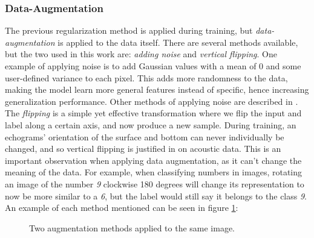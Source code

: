 \subsubsection{Data-Augmentation}
    The previous regularization method is applied during training, but \textit{data-augmentation} is applied to the data itself\cite{kukavcka2017_regularization}. There are several methods available, but the two used in this work are: \textit{adding noise} and \textit{vertical flipping}. One example of applying noise is to add Gaussian values with a mean of 0 and some user-defined variance to each pixel. This adds more randomness to the data, making the model learn more general features instead of specific, hence increasing generalization performance. Other methods of applying noise are described in \citeauthor{kukavcka2017_regularization}\cite{kukavcka2017_regularization}. The \textit{flipping} is a simple yet effective transformation where we flip the input and label along a certain axis, and now produce a new sample. During training, an echograms' orientation of the surface and bottom can never individually be changed, and so vertical flipping is justified in on acoustic data. This is an important observation when applying data augmentation, as it can't change the meaning of the data. For example, when classifying numbers in images, rotating an image of the number \textit{9} clockwise 180 degrees will change its representation to now be more similar to a \textit{6}, but the label would still say it belongs to the class \textit{9}. An example of each method mentioned can be seen in figure \ref{data augmentation fig}:
    
    \begin{figure}[H]
        \centering
        
        
        
        
        \caption[Two data augmentation examples]{Two augmentation methods applied to the same image.}
        \label{data augmentation fig}
        
        \end{figure}
    
    
\clearpage
